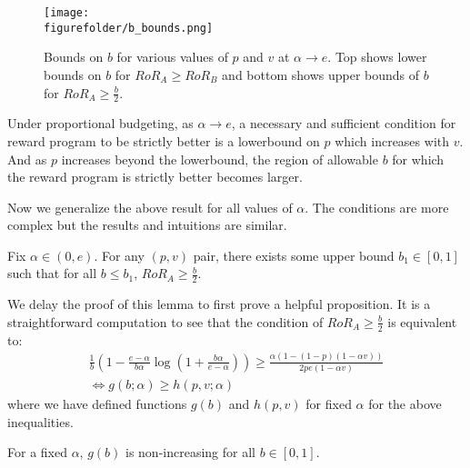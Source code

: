 \begin{figure}[h!]
\begin{centering}
\texttt{[image: \\figurefolder/b\_bounds.png]}
\caption{Bounds on $b$ for various values of $p$ and $v$ at $\alpha \rightarrow e$. Top shows lower bounds on $b$ for $RoR_A \geq RoR_B$ and bottom shows upper bounds of $b$ for $RoR_A \geq \frac{b}{2}$.}
\label{fig:b_restrictions}
\end{centering}
\end{figure}

\begin{theorem}
Under proportional budgeting, as $\alpha\rightarrow e$, a necessary and sufficient condition for reward program to be strictly better is a lowerbound on $p$ which increases with $v$.  
And as $p$ increases beyond the lowerbound, the region of allowable $b$ for which the reward program is strictly better becomes larger. 
\end{theorem}

Now we generalize the above result for all values of $\alpha$. The conditions are more complex but the results and intuitions are similar. 

\begin{lemma}
Fix $\alpha \in (0, e)$. For any $(p,v)$ pair, there exists some upper bound $b_1 \in [0,1]$ such that for all $b \leq b_1$, $RoR_A \geq \frac{b}{2}$.
\end{lemma}

\proof
We delay the proof of this lemma to first prove a helpful proposition. It is a straightforward computation to see that the condition of $RoR_A \geq \frac{b}{2}$ is equivalent to:
\begin{gather*}
\frac{1}{b}\left(1-\frac{e-\alpha}{b\alpha}\log \left(1+\frac{b\alpha}{e-\alpha} \right) \right) \geq \frac{\alpha(1-(1-p)(1-\alpha v))}{2pe(1-\alpha v)} \\
\iff
g(b; \alpha) \geq h(p, v; \alpha)
\end{gather*}
where we have defined functions $g(b)$ and $h(p,v)$ for fixed $\alpha$ for the above inequalities. 

\begin{proposition}
For a fixed $\alpha$, $g(b)$ is non-increasing for all $b \in [0,1]$. 
\end{proposition}


